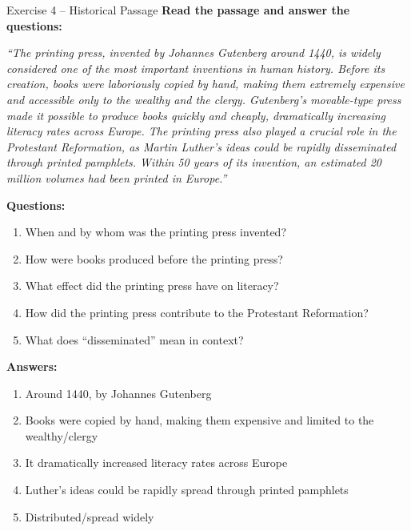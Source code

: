 \documentclass[12pt,a4paper]{article}
\begin{document}
\begin{practicebox}{Exercise 4 -- Historical Passage}
\textbf{Read the passage and answer the questions:}

\textit{``The printing press, invented by Johannes Gutenberg around 1440, is widely considered one of the most important inventions in human history. Before its creation, books were laboriously copied by hand, making them extremely expensive and accessible only to the wealthy and the clergy. Gutenberg's movable-type press made it possible to produce books quickly and cheaply, dramatically increasing literacy rates across Europe. The printing press also played a crucial role in the Protestant Reformation, as Martin Luther's ideas could be rapidly disseminated through printed pamphlets. Within 50 years of its invention, an estimated 20 million volumes had been printed in Europe.''}

\textbf{Questions:}
\begin{enumerate}[noitemsep]
    \item When and by whom was the printing press invented?
    \item How were books produced before the printing press?
    \item What effect did the printing press have on literacy?
    \item How did the printing press contribute to the Protestant Reformation?
    \item What does ``disseminated'' mean in context?
\end{enumerate}

\textbf{Answers:}
\begin{enumerate}[noitemsep]
    \item Around 1440, by Johannes Gutenberg
    \item Books were copied by hand, making them expensive and limited to the wealthy/clergy
    \item It dramatically increased literacy rates across Europe
    \item Luther's ideas could be rapidly spread through printed pamphlets
    \item Distributed/spread widely
\end{enumerate}
\end{practicebox}
\end{document}
